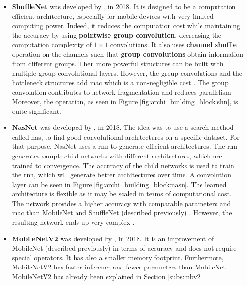 \begin{itemize}
    \item \textbf{ShuffleNet}  was developed by \textcite{zhang_shufflenet_2018}, in 2018. It is designed to be a computation efficient architecture, especially for mobile devices with very limited computing power. Indeed, it reduces the computation cost while maintaining the accuracy by using \textbf{pointwise group convolution}, decreasing the computation complexity of $1 \times 1$ convolutions. It also uses \textbf{channel shufﬂe} operation on the channels such that \textbf{group convolutions} obtain information from different groups. Then more powerful structures can be built with multiple group convolutional layers. However, the group convolutions and the bottleneck structures add \acrfull{mac} which is a non-negligible cost \cite{ma_shufflenet_2018}. The group convolution contributes to network fragmentation and reduces parallelism. Moreover, the  operation, as seen in Figure \ref{fig:archi_building_block:shn}, is quite significant.
    \item \textbf{NasNet} was developed by \textcite{zoph_learning_2018}, in 2018. The idea was to use a search method called \acrfull{nas}, to find good convolutional architectures on a specific dataset. For that purpose, NasNet uses a \acrfull{rnn} to generate efficient architectures. The \acrshort{rnn} generates sample child networks with different architectures, which are trained to convergence. The accuracy of the child networks is used to train the \acrshort{rnn}, which will generate better architectures over time. A convolution layer can be seen in Figure \ref{fig:archi_building_block:nasn}. The learned architecture is flexible as it may be scaled in terms of computational cost. The network provides a higher accuracy with comparable parameters and \acrshort{mac} than MobileNet and ShuffleNet (described previously) \cite{zoph_learning_2018}. However, the resulting network ends up very complex \cite{sandler_mobilenetv2_2018}.
    \item \textbf{MobileNetV2} was developed by \textcite{sandler_mobilenetv2_2018}, in 2018. It is an improvement of MobileNet (described previously) in terms of accuracy and does not require special operators. It has also a smaller memory footprint. Furthermore, MobileNetV2 has faster inference and fewer parameters than MobileNet. MobileNetV2 has already been explained in Section \ref{subs:mbv2}.
\end{itemize}
%
